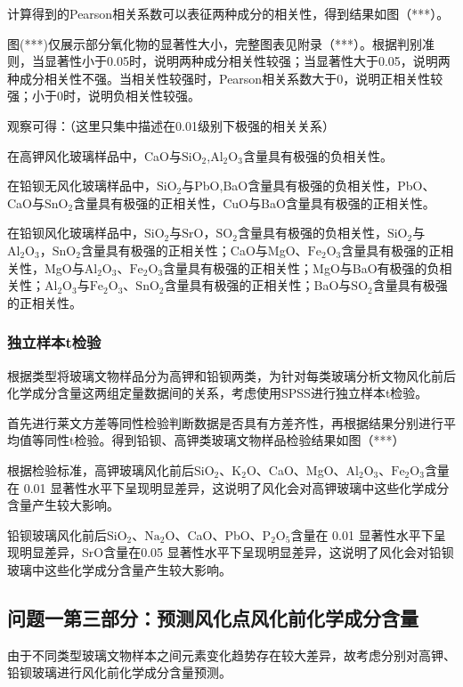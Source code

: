\documentclass[withoutpreface,bwprint]{cumcmthesis}
\newcommand{\mr}[1]{\mathrm{#1}}
\begin{document}
计算得到的Pearson相关系数可以表征两种成分的相关性，得到结果如图（***）。


图(***)仅展示部分氧化物的显著性大小，完整图表见附录（***）。根据判别准则，当显著性小于0.05时，说明两种成分相关性较强；当显著性大于0.05，说明两种成分相关性不强。当相关性较强时，Pearson相关系数大于0，说明正相关性较强；小于0时，说明负相关性较强。

观察可得：（这里只集中描述在0.01级别下极强的相关关系）

在高钾风化玻璃样品中，CaO与$\mr{SiO_2}$,$\mr{Al_2O_3}$含量具有极强的负相关性。

在铅钡无风化玻璃样品中，$\mr{SiO_2}$与PbO,BaO含量具有极强的负相关性，PbO、CaO与$\mr{SnO_2}$含量具有极强的正相关性，CuO与BaO含量具有极强的正相关性。

在铅钡风化玻璃样品中，$\mr{SiO_2}$与$\mr{SrO}$，$\mr{SO_2}$含量具有极强的负相关性，$\mr{SiO_2}$与$\mr{Al_2O_3}$，$\mr{SnO_2}$含量具有极强的正相关性；CaO与MgO、$\mr{Fe_2O_3}$含量具有极强的正相关性，MgO与$\mr{Al_2O_3}$、$\mr{Fe_2O_3}$含量具有极强的正相关性；MgO与BaO有极强的负相关性；$\mr{Al_2O_3}$与$\mr{Fe_2O_3}$、$\mr{SnO_2}$含量具有极强的正相关性；BaO与$\mr{SO_2}$含量具有极强的正相关性。


\subsubsection{独立样本t检验}
\label{se:独立样本t检验}

根据类型将玻璃文物样品分为高钾和铅钡两类，为针对每类玻璃分析文物风化前后化学成分含量这两组定量数据间的关系，考虑使用SPSS进行独立样本t检验。

首先进行莱文方差等同性检验判断数据是否具有方差齐性，再根据结果分别进行平均值等同性t检验。得到铅钡、高钾类玻璃文物样品检验结果如图（***）

根据检验标准，高钾玻璃风化前后$\mr{SiO_2}$、$\mr{K_2O}$、CaO、MgO、$\mr{Al_2O_3}$、$\mr{Fe_2O_3}$含量在 0.01 显著性水平下呈现明显差异，这说明了风化会对高钾玻璃中这些化学成分含量产生较大影响。

铅钡玻璃风化前后$\mr{SiO_2}$、$\mr{Na_2O}$、CaO、PbO、$\mr{P_2O_5}$含量在 0.01 显著性水平下呈现明显差异，SrO含量在0.05 显著性水平下呈现明显差异，这说明了风化会对铅钡玻璃中这些化学成分含量产生较大影响。
\subsection{问题一第三部分：预测风化点风化前化学成分含量}

由于不同类型玻璃文物样本之间元素变化趋势存在较大差异，故考虑分别对高钾、铅钡玻璃进行风化前化学成分含量预测。
\end{document}
